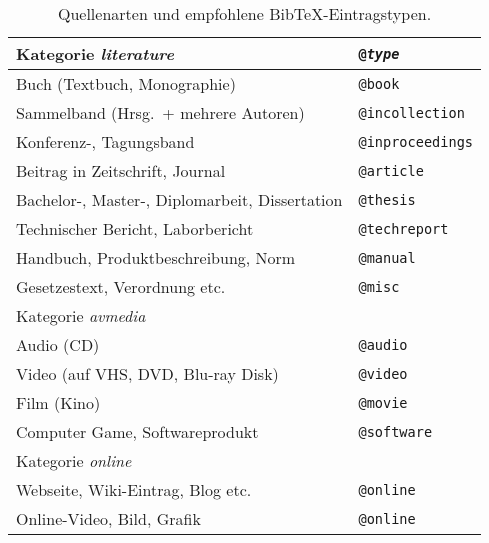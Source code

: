 	\begin{table}
	\caption{Quellenarten und empfohlene BibTeX-Eintragstypen.}
	\label{tab:QuellenUndEintragstypen}
	\centering
	\begin{tabular}{ll}
	\hline
	Kategorie \emph{literature} & \texttt{@\emph{type}} \\
	\hline
	Buch (Textbuch, Monographie) & \texttt{@book }\\
	Sammelband (Hrsg.\ + mehrere Autoren) & \texttt{@incollection} \\
	Konferenz-, Tagungsband & \texttt{@inproceedings}\\
	Beitrag in Zeitschrift, Journal & \texttt{@article} \\
	Bachelor-, Master-, Diplomarbeit, Dissertation & \texttt{@thesis} \\
	Technischer Bericht, Laborbericht & \texttt{@techreport} \\
	Handbuch, Produktbeschreibung, Norm & \texttt{@manual} \\
	Gesetzestext, Verordnung etc. & \texttt{@misc}\\
	\hline
	Kategorie \emph{avmedia} & \\
	\hline
	Audio (CD) & \texttt{@audio} \\
	Video (auf VHS, DVD, Blu-ray Disk) & \texttt{@video}\\
	Film (Kino) & \texttt{@movie}\\
	Computer Game, Softwareprodukt & \texttt{@software} \\
	\hline
	Kategorie \emph{online} & \\
	\hline
	Webseite, Wiki-Eintrag, Blog etc. & \texttt{@online} \\
	Online-Video, Bild, Grafik & \texttt{@online}\\
	\end{tabular}
	\end{table}





